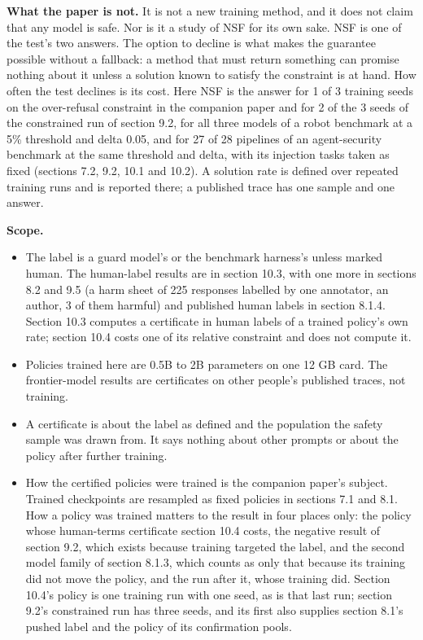 \documentclass[11pt]{article}
\begin{document}
\textbf{What the paper is not.} It is not a new training method, and it does not claim that any model is safe. Nor is it a study of NSF for its own sake. NSF is one of the test's two answers. The option to decline is what makes the guarantee possible without a fallback: a method that must return something can promise nothing about it unless a solution known to satisfy the constraint is at hand. How often the test declines is its cost. Here NSF is the answer for 1 of 3 training seeds on the over-refusal constraint in the companion paper and for 2 of the 3 seeds of the constrained run of section 9.2, for all three models of a robot benchmark at a 5\% threshold and delta 0.05, and for 27 of 28 pipelines of an agent-security benchmark at the same threshold and delta, with its injection tasks taken as fixed (sections 7.2, 9.2, 10.1 and 10.2). A solution rate is defined over repeated training runs and is reported there; a published trace has one sample and one answer.


\textbf{Scope.}


\begin{itemize}
\item The label is a guard model's or the benchmark harness's unless marked human. The human-label results are in section 10.3, with one more in sections 8.2 and 9.5 (a harm sheet of 225 responses labelled by one annotator, an author, 3 of them harmful) and published human labels in section 8.1.4. Section 10.3 computes a certificate in human labels of a trained policy's own rate; section 10.4 costs one of its relative constraint and does not compute it.
\item Policies trained here are 0.5B to 2B parameters on one 12 GB card. The frontier-model results are certificates on other people's published traces, not training.
\item A certificate is about the label as defined and the population the safety sample was drawn from. It says nothing about other prompts or about the policy after further training.
\item How the certified policies were trained is the companion paper's subject. Trained checkpoints are resampled as fixed policies in sections 7.1 and 8.1. How a policy was trained matters to the result in four places only: the policy whose human-terms certificate section 10.4 costs, the negative result of section 9.2, which exists because training targeted the label, and the second model family of section 8.1.3, which counts as only that because its training did not move the policy, and the run after it, whose training did. Section 10.4's policy is one training run with one seed, as is that last run; section 9.2's constrained run has three seeds, and its first also supplies section 8.1's pushed label and the policy of its confirmation pools.
\end{itemize}
\end{document}
